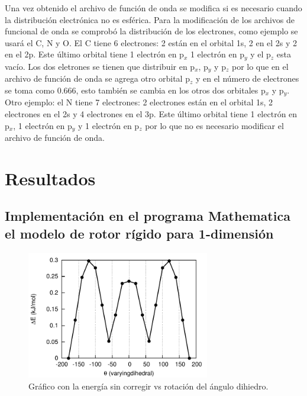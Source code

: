 \documentclass[12pt,letterpaper]{article}
\begin{document}
Una vez obtenido el archivo de función de onda se modifica si es necesario cuando la distribución electrónica no es esférica. 
Para la modificación de los archivos de funcional de onda se comprobó la distribución de los electrones, como ejemplo se usará el C, N y O.
El C tiene 6 electrones: 2 están en el orbital 1s, 2 en el 2s y 2 en el 2p. Este último orbital tiene 1 electrón en p$_x$ 1 electrón en p$_y$ y el p$_z$ esta vacío. Los dos eletrones se tienen que distribuir en p$_x$, p$_y$ y p$_z$ por lo que en el archivo de función de onda se agrega otro orbital p$_z$ y en el número de electrones se toma como 0.666, esto también se cambia en los otros dos orbitales p$_x$ y p$_y$. Otro ejemplo: el N tiene 7 electrones: 2 electrones están en el orbital 1s, 2 electrones en el 2s y 4 electrones en el 3p. Este último orbital tiene 1 electrón en p$_x$, 1 electrón en p$_y$ y 1 electrón en p$_z$ por lo que no es necesario modificar el archivo de función de onda.
\\


\section{Resultados}
\subsection{Implementación en el programa Mathematica el modelo de rotor rígido para 1-dimensión}

\begin{figure}[H]
 \begin{center}
 \includegraphics[width=8cm]{tolueno_sin_corr.pdf}
 \caption{Gráfico con la energía sin corregir vs rotación del ángulo dihiedro.}
\end{center}
\end{figure}
\end{document}
